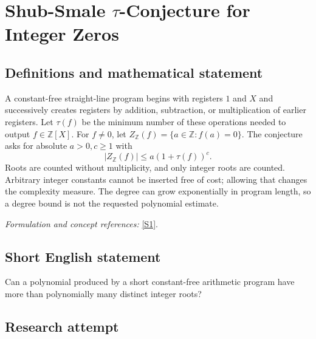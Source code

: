 \documentclass[11pt,a4paper]{article}
\newcommand{\Z}{\mathbb{Z}}
\newcommand{\sref}[2]{\hyperlink{source:#1:#2}{[S#2]}}
\newif\ifshowcatalogue
\newcommand{\cataloguescope}[1]{\ifshowcatalogue
 \paragraph{Exact scope in the supplied catalogue.}
 \begin{quote}\small #1\end{quote}\fi}
\numberwithin{equation}{section}
\begin{document}
\setcounter{section}{223}
\clearpage
\section{\texorpdfstring{Shub-Smale \ensuremath{\tau}-Conjecture for Integer Zeros}{Shub-Smale τ-Conjecture for Integer Zeros}}\label{224}
\subsection{Definitions and mathematical statement}
A constant-free straight-line program begins with registers $1$ and $X$ and successively creates registers by addition, subtraction, or multiplication of earlier registers. Let $\tau(f)$ be the minimum number of these operations needed to output $f\in\Z[X]$. For $f\ne0$, let $Z_{\Z}(f)=\{a\in\Z:f(a)=0\}$. The conjecture asks for absolute $a>0,c\ge1$ with
\[
 |Z_{\Z}(f)|\le a(1+\tau(f))^c.
\]
Roots are counted without multiplicity, and only integer roots are counted. Arbitrary integer constants cannot be inserted free of cost; allowing that changes the complexity measure. The degree can grow exponentially in program length, so a degree bound is not the requested polynomial estimate.
\par\smallskip\textit{Formulation and concept references:} \sref{224}{1}.
\cataloguescope{Determine whether universal constants a > 0 and c >= 1 exist such that every nonzero polynomial f in Z[x] has at most a(1 + tau(f))\textasciicircum{}c distinct integer zeros, where tau(f) is the shortest constant-free straight-line-program length using addition, subtraction, and multiplication, starting from 1 and x.}
\subsection{Short English statement}
Can a polynomial produced by a short constant-free arithmetic program have more than polynomially many distinct integer roots?
\subsection{Research attempt}
\end{document}
